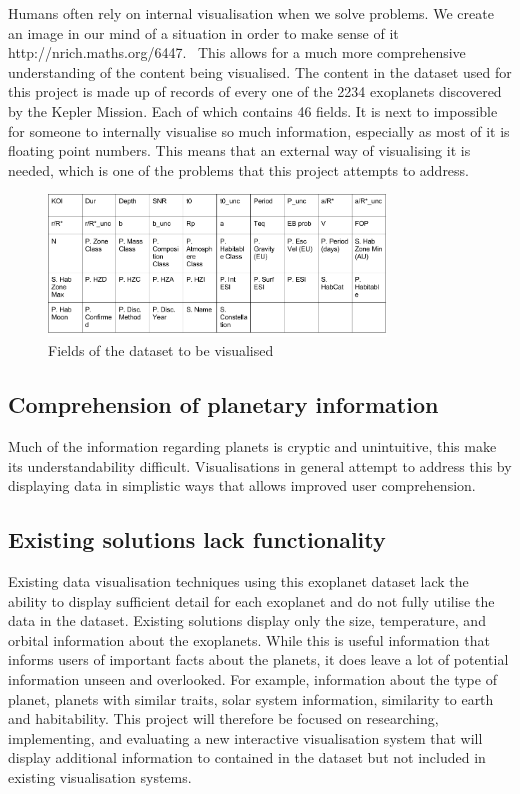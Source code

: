 Humans often rely on internal visualisation when we solve problems. We create an
image in our mind of a situation in order to make sense of it
http://nrich.maths.org/6447.~ This allows for a much more comprehensive
understanding of the content being visualised. The content in the dataset used
for this project is made up of records of every one of the 2234 exoplanets
discovered by the Kepler Mission. Each of which contains 46 fields. It is next
to impossible for someone to internally visualise so much information,
especially as most of it is floating point numbers. This means that an external
way of visualising it is needed, which is one of the problems that this project
attempts to address. 
\begin{figure}[h!]
  \centering
      \includegraphics[width=0.8\textwidth]{images/data.png}
  \caption{Fields of the dataset to be visualised}
\end{figure}

\subsection{Comprehension of planetary information}
Much of the information regarding planets is cryptic and unintuitive, this make
its understandability difficult. Visualisations in general attempt to address
this by displaying data in simplistic ways that allows improved user
comprehension.

\subsection{Existing solutions lack functionality}
Existing data visualisation techniques using this exoplanet dataset lack the
ability to display sufficient detail for each exoplanet and do not fully utilise
the data in the dataset. Existing solutions display only the size, temperature,
and orbital information about the exoplanets. While this is useful information
that informs users of important facts about the planets, it does leave a lot of
potential information unseen and overlooked. For example, information about the
type of planet, planets with similar traits, solar system information,
similarity to earth and habitability. This project will therefore be focused on
researching, implementing, and evaluating a new interactive visualisation system
that will display additional information to contained in the dataset but not
included in existing visualisation systems.

